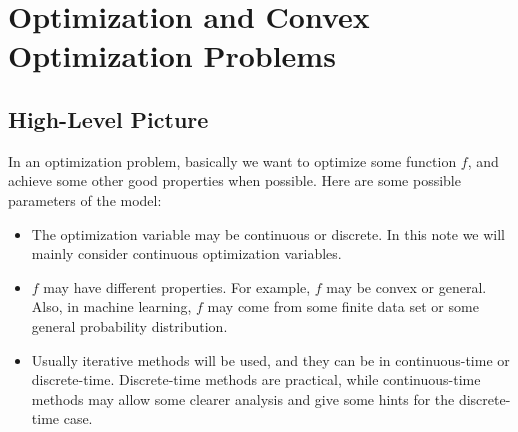 \documentclass[openany]{book}
\newtheorem{theorem}{Theorem}[chapter]
\theoremstyle{definition}
\theoremstyle{remark}
\begin{document}
\begin{comment}
\paragraph{Remark}
One application is that suppose $f$ is twice differentiable, then $f$ is supermodular on $\mathbb{R}^n$ iff the off-diagonal entries of its Hessian is non-negative everywhere.

\begin{theorem}[\cite{T11} Theorem 2.6.4]
    Suppose for any $i\in[n]$, $P_i$ is a chain. Then $f$ is separable on $\prod_{i\in I}P_i$ iff $f$ is modular on $\prod_{i\in I}P_i$.
\end{theorem}

\section{Basic Properties}
\begin{theorem}[\cite{T11} Theorem 2.7.1 and Theorem 2.7.5]
    If $f$ is (strictly) supermodular on a lattice $P$, then $\arg\max_{x\in P}f(x)$ is a sublattice (chain) of $P$.
\end{theorem}
\begin{theorem}[\cite{T11} Theorem 2.7.6 and Theorem 2.7.7]
    Suppose $P$ and $Q$ are two lattices, $L$ is a sublattice of $P\times Q$, and $f$ is a (strictly) supermodular function on $L$. For each $q\in \Pi_QL$, assume $g(q)=\sup_{p\in S_q}f(p,q)$ ($\max_{p\in S_q}f(p,q)$) exists and is finite. Then $g$ is (strictly) supermodular on $\Pi_QL$.
\end{theorem}
\end{comment}

\chapter{Optimization and Convex Optimization Problems}
\section{High-Level Picture}
In an optimization problem, basically we want to optimize some function $f$, and achieve some other good properties when possible. Here are some possible parameters of the model:
\begin{itemize}
    \item The optimization variable may be continuous or discrete. In this note we will mainly consider continuous optimization variables.
    \item $f$ may have different properties. For example, $f$ may be convex or general. Also, in machine learning, $f$ may come from some finite data set or some general probability distribution.
    \item Usually iterative methods will be used, and they can be in continuous-time or discrete-time. Discrete-time methods are practical, while continuous-time methods may allow some clearer analysis and give some hints for the discrete-time case.
\end{itemize}
\end{document}
